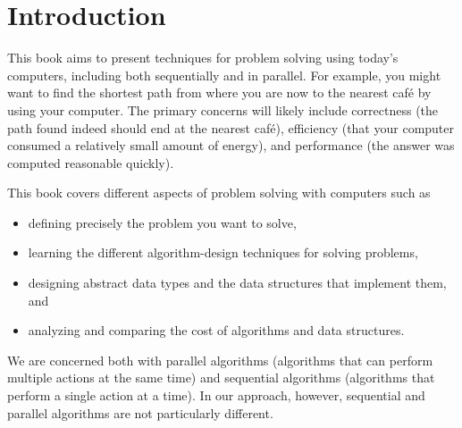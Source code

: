 \chapter{Introduction}
\label{ch:introduction::intro}

\begin{gram} 
This book aims to present techniques for problem solving using today's computers, including both sequentially and in parallel.
%
For example, you might want to find the shortest path from where you are now to the nearest caf\'e by using your computer.
%
The primary concerns will likely include correctness (the path found indeed should end at the nearest caf\'e), 
%
efficiency (that your computer consumed a relatively small amount of energy), and performance (the answer was computed reasonable quickly).
%

This book covers different aspects of problem solving with computers such as 
\begin{itemize}
\item defining precisely the problem you want to solve,
\item learning the different algorithm-design techniques for solving problems,
\item designing abstract data types and the data structures that
  implement them, and
%
\item analyzing and comparing the cost of algorithms and data structures.
%
\end{itemize}
\end{gram}

\begin{remark}
We are concerned both with 
%
parallel algorithms (algorithms that can perform multiple actions at the same time)
%
and 
%
sequential algorithms (algorithms that perform a single action at a time).
%
In our approach, however, sequential and parallel algorithms are not particularly different.
%
\end{remark}
